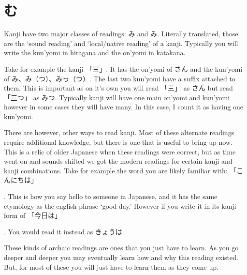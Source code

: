 \section[読む方法]{む}\label{sec:PR;漢字;読む;方法}

Kanji have two major classes of readings: み and み. Literally translated, those are the `sound reading' and `local/native reading' of a kanji. Typically you will write the kun'yomi in hiragana and the on'yomi in katakana.

Take for example the kanji 「三」. It has the on'yomi of さん and the kun'yomi of み、み（つ）、みっ（つ）. The last two kun'yomi have a suffix attached to them. This is important as on it's own you will read 「三」 as さん but read 「三つ」 as みつ. Typically kanji will have one main on'yomi and kun'yomi however in some cases they will have many. In this case, I count it as having one kun'yomi.

There are however, other ways to read kanji. Most of these alternate readings require additional knowledge, but there is one that is useful to bring up now. This is a relic of older Japanese when these readings were correct, but as time went on and sounds shifted we got the modern readings for certain kanji and kanji combinations. Take for example the word you are likely familiar with: 「こんにちは」\footnotemark\addtocounter{footnote}{-1}. This is how you say hello to someone in Japanese, and it has the same etymology as the english phrase `good day.' However if you write it in its kanji form of 「今日は」\footnotemark\addtocounter{footnote}{-1}. You would read it instead as きょうは\footnotemark.

These kinds of archaic readings are ones that you just have to learn. As you go deeper and deeper you may eventually learn how and why this reading existed. But, for most of these you will just have to learn them as they come up.